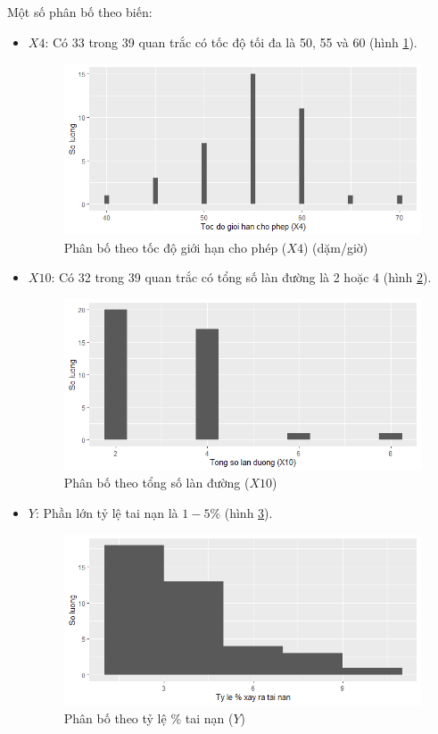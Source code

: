 Một số phân bố theo biến:
\begin{itemize}
	\item $X4$: Có 33 trong 39 quan trắc có tốc độ tối đa là 50, 55 và 60 (hình \ref{fig-b3:plot-x4}).
	\begin{figure}[H]
		\centering
		\includegraphics[width=0.7\linewidth]{images/B3/plot-x4}
		\caption{Phân bố theo tốc độ giới hạn cho phép ($X4$) (dặm/giờ)}
		\label{fig-b3:plot-x4}
	\end{figure}
	\item $X10$: Có 32 trong 39 quan trắc có tổng số làn đường là 2 hoặc 4 (hình \ref{fig-b3:plot-x10}).
		\begin{figure}[H]
			\centering
			\includegraphics[width=0.7\linewidth]{images/B3/plot-x10}
			\caption{Phân bố theo tổng số làn đường ($X10$)}
			\label{fig-b3:plot-x10}
		\end{figure}
	\item $Y$: Phần lớn tỷ lệ tai nạn là $1-5\%$ (hình \ref{fig-b3:plot-y}).
		\begin{figure}[H]
			\centering
			\includegraphics[width=0.7\linewidth]{images/B3/plot-y}
			\caption{Phân bố theo tỷ lệ \% tai nạn ($Y$)}
			\label{fig-b3:plot-y}
		\end{figure}
\end{itemize}

